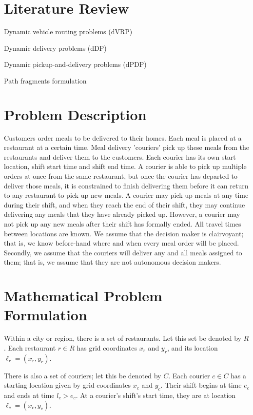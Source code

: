 \documentclass{article}
\begin{document}
\tableofcontents{}

\section{Literature Review}

Dynamic vehicle routing problems (dVRP)

Dynamic delivery problems (dDP)

Dynamic pickup-and-delivery problems (dPDP)

Path fragments formulation

\section{Problem Description}

Customers order meals to be delivered to their homes. Each meal is placed at a restaurant at a certain time. Meal delivery 'couriers' pick up these meals from the restaurants and deliver them to the customers. Each courier has its own start location, shift start time and shift end time. A courier is able to pick up multiple orders at once from the same restaurant, but once the courier has departed to deliver those meals, it is constrained to finish delivering them before it can return to any restaurant to pick up new meals. A courier may pick up meals at any time during their shift, and when they reach the end of their shift, they may continue delivering any meals that they have already picked up. However, a courier may not pick up any new meals after their shift has formally ended. All travel times between locations are known. We assume that the decision maker is clairvoyant; that is, we know before-hand where and when every meal order will be placed. Secondly, we assume that the couriers will deliver any and all meals assigned to them; that is, we assume that they are not autonomous decision makers.

\section{Mathematical Problem Formulation}

Within a city or region, there is a set of restaurants. Let this set be denoted by $R$. Each restaurant $r\in R$ has grid coordinates $x_r$ and $y_r$, and its location $\ell_r=(x_r, y_r)$.

There is also a set of couriers; let this be denoted by $C$. Each courier $c\in C$ has a starting location given by grid coordinates $x_c$ and $y_c$. Their shift begins at time $e_c$ and ends at time $l_c>e_c$. At a courier's shift's start time, they are at location $\ell_c=(x_c, y_c)$.
\end{document}
